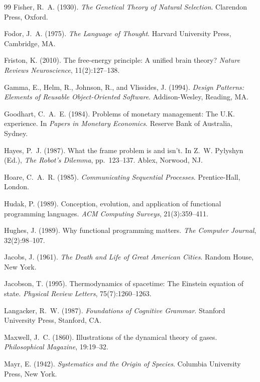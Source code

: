 \documentclass[12pt, a4paper]{article}
\theoremstyle{plain}
\theoremstyle{definition}
\theoremstyle{remark}
\begin{document}
\begin{thebibliography}{99}
Fisher, R.~A. (1930). \textit{The Genetical Theory of Natural Selection}.
Clarendon Press, Oxford.

Fodor, J.~A. (1975). \textit{The Language of Thought}. Harvard University
Press, Cambridge, MA.

Friston, K. (2010). The free-energy principle: A unified brain theory?
\textit{Nature Reviews Neuroscience}, 11(2):127--138.

Gamma, E., Helm, R., Johnson, R., and Vlissides, J. (1994). \textit{Design
Patterns: Elements of Reusable Object-Oriented Software}. Addison-Wesley,
Reading, MA.

Goodhart, C.~A.~E. (1984). Problems of monetary management: The U.K.
experience. In \textit{Papers in Monetary Economics}. Reserve Bank of
Australia, Sydney.

Hayes, P.~J. (1987). What the frame problem is and isn't. In Z.~W. Pylyshyn
(Ed.), \textit{The Robot's Dilemma}, pp.\ 123--137. Ablex, Norwood, NJ.

Hoare, C.~A.~R. (1985). \textit{Communicating Sequential Processes}.
Prentice-Hall, London.

Hudak, P. (1989). Conception, evolution, and application of functional
programming languages. \textit{ACM Computing Surveys}, 21(3):359--411.

Hughes, J. (1989). Why functional programming matters. \textit{The Computer
Journal}, 32(2):98--107.

Jacobs, J. (1961). \textit{The Death and Life of Great American Cities}.
Random House, New York.

Jacobson, T. (1995). Thermodynamics of spacetime: The Einstein equation of
state. \textit{Physical Review Letters}, 75(7):1260--1263.

Langacker, R.~W. (1987). \textit{Foundations of Cognitive Grammar}.
Stanford University Press, Stanford, CA.

Maxwell, J.~C. (1860). Illustrations of the dynamical theory of gases.
\textit{Philosophical Magazine}, 19:19--32.

Mayr, E. (1942). \textit{Systematics and the Origin of Species}. Columbia
University Press, New York.


\end{thebibliography}
\end{document}
